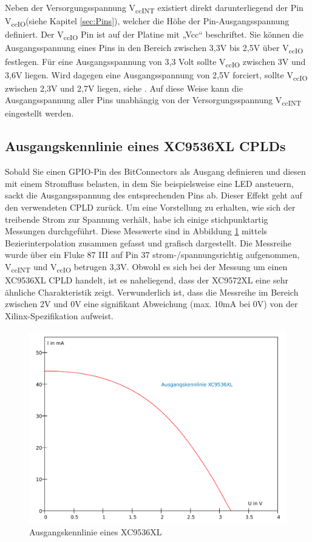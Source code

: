 \documentclass{article}
\begin{document}
{Neben der Versorgungsspannung V\textsubscript{ccINT} existiert direkt darunterliegend der Pin V\textsubscript{ccIO}(siehe Kapitel \ref{sec:Pins}), welcher die Höhe der Pin-Ausgangsspannung definiert. Der V\textsubscript{ccIO} Pin ist auf der Platine mit „Vcc“ beschriftet. Sie können die Ausgangsspannung eines Pins in den Bereich zwischen 3,3V bis 2,5V über  V\textsubscript{ccIO} festlegen. Für eine Ausgangsspannung von 3,3 Volt sollte V\textsubscript{ccIO} zwischen 3V und 3,6V liegen. Wird dagegen eine Ausgangsspannung von 2,5V forciert, sollte V\textsubscript{ccIO} zwischen 2,3V und 2,7V liegen, siehe \autocite[3]{XC95_Spec}. Auf diese Weise kann die Ausgangsspannung aller Pins unabhängig von der Versorgungsspannung V\textsubscript{ccINT} eingestellt werden.

\subsection{Ausgangskennlinie eines XC9536XL CPLDs}
Sobald Sie einen GPIO-Pin des BitConnectors als Ausgang definieren und diesen mit einem Stromfluss belasten, in dem Sie beispielsweise eine LED ansteuern, sackt die Ausgangsspannung des entsprechenden Pins ab. Dieser Effekt geht auf den verwendeten CPLD zurück. Um eine Vorstellung zu erhalten, wie sich der treibende Strom zur Spannung verhält, habe ich einige stichpunktartig Messungen durchgeführt. Diese Messwerte sind in Abbildung \ref{fig:out_characteristics} mittels Bezierinterpolation zusammen gefasst und grafisch dargestellt.
Die Messreihe wurde über ein Fluke 87 III auf Pin 37 strom-/spannungsrichtig aufgenommen, V\textsubscript{ccINT} und V\textsubscript{ccIO} betrugen 3,3V. Obwohl es sich bei der Messung um einen XC9536XL CPLD handelt, ist es naheliegend, dass der XC9572XL eine sehr ähnliche Charakteristik zeigt. Verwunderlich ist, dass die Messreihe im Bereich zwischen 2V und 0V eine signifikant Abweichung (max. 10mA bei 0V) von der Xilinx-Spezifikation \autocite[6]{XC_Curves} aufweist.

\begin{figure}[!h]
	\centering
	\includegraphics[width=0.76\linewidth]{Figures/XC9536_output_characteristics}
	\caption{Ausgangskennlinie eines XC9536XL}
	\label{fig:out_characteristics}
\end{figure}

}
\end{document}

